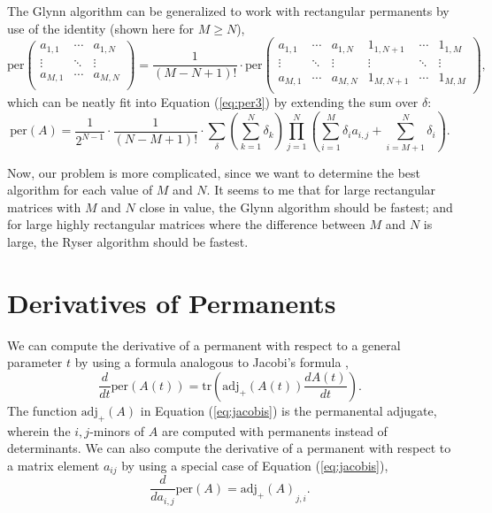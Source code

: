 \documentclass{article}
\begin{document}
The Glynn algorithm can be generalized to work with rectangular permanents by use of the identity
(shown here for $M \geq N$),
\begin{equation} \label{eq:padidentity}
    {\text{per}}\left(
        \begin{matrix}
            a_{1,1} & \cdots & a_{1,N} \\
            \vdots & \ddots & \vdots \\
            a_{M,1} & \cdots & a_{M,N} \\
        \end{matrix}
    \right)
    = \frac{1}{\left(M - N + 1\right)!} \cdot {\text{per}}\left(
        \begin{matrix}
            a_{1,1} & \cdots & a_{1,N} & 1_{1,N+1} & \cdots & 1_{1,M} \\
            \vdots & \ddots & \vdots & \vdots & \ddots & \vdots \\
            a_{M,1} & \cdots & a_{M,N} & 1_{M,N+1} & \cdots & 1_{M,M} \\
        \end{matrix}
    \right),
\end{equation}
which can be neatly fit into Equation (\ref{eq:per3}) by extending the sum over $\delta$:
\begin{equation} \label{eq:rectper3}
    \text{per}(A) = \frac{1}{2^{N-1}} \cdot \frac{1}{\left(N - M + 1\right)!} \cdot \sum_{\delta}{
        \left(\sum_{k=1}^N{\delta_k}\right)
        \prod_{j=1}^N{\left(\sum_{i=1}^M{\delta_i a_{i,j}} + \sum_{i=M+1}^N{\delta_i}\right)}
    }.
\end{equation}

Now, our problem is more complicated, since we want to determine the best algorithm for each value
of $M$ and $N$. It seems to me that for large rectangular matrices with $M$ and $N$ close in value,
the Glynn algorithm should be fastest; and for large highly rectangular matrices where the
difference between $M$ and $N$ is large, the Ryser algorithm should be fastest.

\section*{Derivatives of Permanents}

We can compute the derivative of a permanent with respect to a general parameter $t$ by using
a formula analogous to Jacobi's formula \cite{carvalho2014},
\begin{equation} \label{eq:jacobis}
    \frac{d}{dt}\text{per}(A(t)) = \text{tr}\left(\text{adj}_{+}(A(t))\frac{dA(t)}{dt}\right).
\end{equation}
The function $\text{adj}_{+}(A)$ in Equation (\ref{eq:jacobis}) is the permanental adjugate, wherein
the $i,j$-minors of $A$ are computed with permanents instead of determinants. We can also compute
the derivative of a permanent with respect to a matrix element $a_{ij}$ by using a special case of
Equation (\ref{eq:jacobis}),
\begin{equation}
    \frac{d}{d{a_{i,j}}}\text{per}(A) = {\text{adj}_{+}(A)}_{j,i}.
\end{equation}

\pagebreak



\end{document}

